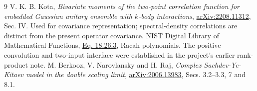 \documentclass[11pt,a4paper]{article}
\begin{document}
\begin{thebibliography}{9}\small
{} V. K. B. Kota, \emph{Bivariate moments of the two-point
correlation function for embedded Gaussian unitary ensemble with
$k$-body interactions},
\href{https://arxiv.org/abs/2208.11312}{arXiv:2208.11312}, Sec. IV.
Used for covariance representation; spectral-density correlations
are distinct from the present operator covariance.
 NIST Digital Library of Mathematical Functions,
\href{https://dlmf.nist.gov/18.26.E3}{Eq. 18.26.3}, Racah polynomials.
The positive convolution and two-input interface were established
in the project's earlier rank-product note.
 M. Berkooz, V. Narovlansky and H. Raj,
\emph{Complex Sachdev-Ye-Kitaev model in the double scaling limit},
\href{https://arxiv.org/abs/2006.13983}{arXiv:2006.13983},
Secs. 3.2--3.3, 7 and 8.1.
\end{thebibliography}
\end{document}
